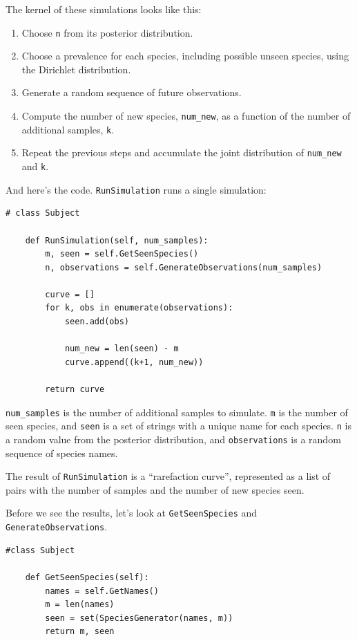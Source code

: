 \documentclass[12pt]{book}
\begin{document}
The kernel of these simulations looks like this:

\begin{enumerate}

\item Choose {\tt n} from its posterior distribution.

\item Choose a prevalence for each species, including possible unseen
  species, using the Dirichlet distribution.

\item Generate a random sequence of future observations.

\item Compute the number of new species, \verb"num_new", as a function
  of the number of additional samples, {\tt k}.

\item Repeat the previous steps and accumulate the joint distribution
  of \verb"num_new" and {\tt k}.

\end{enumerate}

And here's the code.  {\tt RunSimulation} runs a single simulation:

\begin{verbatim}
# class Subject

    def RunSimulation(self, num_samples):
        m, seen = self.GetSeenSpecies()
        n, observations = self.GenerateObservations(num_samples)

        curve = []
        for k, obs in enumerate(observations):
            seen.add(obs)

            num_new = len(seen) - m
            curve.append((k+1, num_new))

        return curve
\end{verbatim}

\verb"num_samples" is the number of additional samples to simulate.
{\tt m} is the number of seen species, and {\tt seen} is a set of
strings with a unique name for each species.
{\tt n} is a random value from the posterior distribution, and
{\tt observations} is a random sequence of species names.

The result of {\tt RunSimulation} is a ``rarefaction curve'',
represented as a list of pairs with the number of samples and
the number of new species seen.

Before we see the results, let's look at {\tt GetSeenSpecies} and
{\tt GenerateObservations}.

\begin{verbatim}
#class Subject

    def GetSeenSpecies(self):
        names = self.GetNames()
        m = len(names)
        seen = set(SpeciesGenerator(names, m))
        return m, seen
\end{verbatim}
\end{document}
